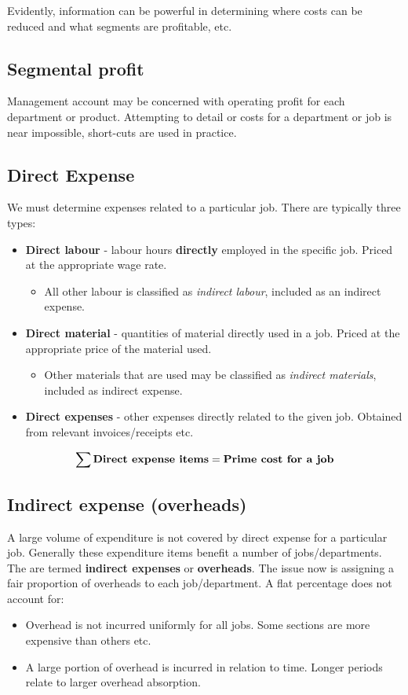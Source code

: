 Evidently, information can be powerful in determining where costs can be reduced and what segments are profitable, etc.

\subsection{Segmental profit}
Management account may be concerned with operating profit for each department or product. Attempting to detail or costs for a department or job is near impossible, short-cuts are used in practice.

\subsection{Direct Expense}
We must determine expenses related to a particular job. There are typically three types:

\begin{itemize}
    \item \textbf{Direct labour} - labour hours \textbf{directly} employed in the specific job. Priced at the appropriate wage rate.
    \begin{itemize}
        \item All other labour is classified as \textit{indirect labour}, included as an indirect expense.
    \end{itemize}
    \item \textbf{Direct material} - quantities of material directly used in a job. Priced at the appropriate price of the material used.
    \begin{itemize}
        \item Other materials that are used may be classified as \textit{indirect materials}, included as indirect expense.
    \end{itemize}
    \item \textbf{Direct expenses} - other expenses directly related to the given job. Obtained from relevant invoices/receipts etc.
\end{itemize}

$$\sum\text{\bf{Direct expense items}} = \text{\bf{Prime cost for a job}}$$

\subsection{Indirect expense (overheads)}
A large volume of expenditure is not covered by direct expense for a particular job. Generally these expenditure items benefit a number of jobs/departments. The are termed \textbf{indirect expenses} or \textbf{overheads}. The issue now is assigning a fair proportion of overheads to each job/department. A flat percentage does not account for:

\begin{itemize}
    \item Overhead is not incurred uniformly for all jobs. Some sections are more expensive than others etc.
    \item A large portion of overhead is incurred in relation to time. Longer periods relate to larger overhead absorption.
\end{itemize}